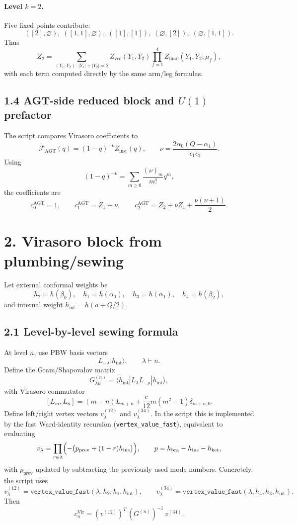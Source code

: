 \documentclass[11pt]{article}
\begin{document}
\paragraph{Level $k=2$.}
Five fixed points contribute:
\[
([2],\varnothing),\;([1,1],\varnothing),\;([1],[1]),\;(\varnothing,[2]),\;(\varnothing,[1,1]).
\]
Thus
\[
Z_2=
\sum_{(Y_1,Y_2):\,|Y_1|+|Y_2|=2}
Z_{\mathrm{vec}}(Y_1,Y_2)\prod_{f=1}^4 Z_{\mathrm{fund}}(Y_1,Y_2;\mu_f),
\]
with each term computed directly by the same arm/leg formulas.

\subsection*{1.4 AGT-side reduced block and $U(1)$ prefactor}

The script compares Virasoro coefficients to
\[
\mathcal F_{\mathrm{AGT}}(q)=(1-q)^{-\nu}Z_{\mathrm{inst}}(q),
\qquad
\nu=\frac{2\alpha_0(Q-\alpha_1)}{\epsilon_1\epsilon_2}.
\]
Using
\[
(1-q)^{-\nu}=\sum_{m\ge0}\frac{(\nu)_m}{m!}q^m,
\]
the coefficients are
\[
c^{\mathrm{AGT}}_0=1,
\qquad
c^{\mathrm{AGT}}_1=Z_1+\nu,
\qquad
c^{\mathrm{AGT}}_2=Z_2+\nu Z_1+\frac{\nu(\nu+1)}{2}.
\]

\section*{2. Virasoro block from plumbing/sewing}

Let external conformal weights be
\[
h_2=h(\beta_0),\quad
h_1=h(\alpha_0),\quad
h_3=h(\alpha_1),\quad
h_4=h(\beta_2),
\]
and internal weight $h_{\mathrm{int}}=h(a+Q/2)$.

\subsection*{2.1 Level-by-level sewing formula}

At level $n$, use PBW basis vectors
\[
L_{-\lambda}|h_{\mathrm{int}}\rangle,\qquad \lambda\vdash n.
\]
Define the Gram/Shapovalov matrix
\[
G^{(n)}_{\lambda\mu}
=\langle h_{\mathrm{int}}|L_{\lambda}L_{-\mu}|h_{\mathrm{int}}\rangle,
\]
with Virasoro commutator
\[
[L_m,L_n]=(m-n)L_{m+n}+\frac{c}{12}m(m^2-1)\delta_{m+n,0}.
\]
Define left/right vertex vectors $v^{(12)}_\lambda$ and $v^{(34)}_\lambda$.
In the script this is implemented by the fast Ward-identity recursion
(\texttt{vertex\_value\_fast}), equivalent to evaluating
\[
v_\lambda=\prod_{r\in\lambda}\Bigl(-\bigl(p_{\text{prev}}+(1-r)h_{\text{ins}}\bigr)\Bigr),
\qquad
p=h_{\mathrm{bra}}-h_{\mathrm{ins}}-h_{\mathrm{ket}},
\]
with $p_{\text{prev}}$ updated by subtracting the previously used mode numbers.
Concretely, the script uses
\[
v^{(12)}_\lambda=\texttt{vertex\_value\_fast}(\lambda,h_2,h_1,h_{\mathrm{int}}),
\qquad
v^{(34)}_\lambda=\texttt{vertex\_value\_fast}(\lambda,h_4,h_3,h_{\mathrm{int}}).
\]
Then
\[
c_n^{\mathrm{Vir}}=(v^{(12)})^T\,(G^{(n)})^{-1}\,v^{(34)}.
\]
\end{document}
